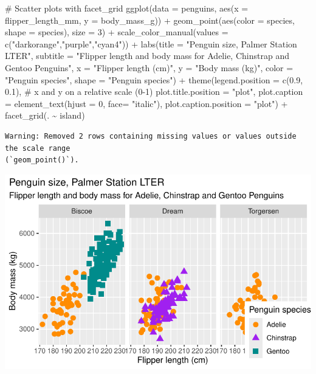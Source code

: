 \documentclass[
  letterpaper,
  DIV=11,
  numbers=noendperiod]{scrreprt}
\newenvironment{Shaded}{\begin{snugshade}}{\end{snugshade}}
\newcommand{\AttributeTok}[1]{\textcolor[rgb]{0.40,0.45,0.13}{#1}}
\newcommand{\CommentTok}[1]{\textcolor[rgb]{0.37,0.37,0.37}{#1}}
\newcommand{\DecValTok}[1]{\textcolor[rgb]{0.68,0.00,0.00}{#1}}
\newcommand{\FloatTok}[1]{\textcolor[rgb]{0.68,0.00,0.00}{#1}}
\newcommand{\FunctionTok}[1]{\textcolor[rgb]{0.28,0.35,0.67}{#1}}
\newcommand{\NormalTok}[1]{\textcolor[rgb]{0.00,0.23,0.31}{#1}}
\newcommand{\SpecialCharTok}[1]{\textcolor[rgb]{0.37,0.37,0.37}{#1}}
\newcommand{\StringTok}[1]{\textcolor[rgb]{0.13,0.47,0.30}{#1}}
\begin{document}
\begin{Shaded}
\begin{Highlighting}[]
\CommentTok{\# Scatter plots with facet\_grid}
\FunctionTok{ggplot}\NormalTok{(}\AttributeTok{data =}\NormalTok{ penguins, }\FunctionTok{aes}\NormalTok{(}\AttributeTok{x =}\NormalTok{ flipper\_length\_mm, }\AttributeTok{y =}\NormalTok{ body\_mass\_g)) }\SpecialCharTok{+}
  \FunctionTok{geom\_point}\NormalTok{(}\FunctionTok{aes}\NormalTok{(}\AttributeTok{color =}\NormalTok{ species, }\AttributeTok{shape =}\NormalTok{ species), }\AttributeTok{size =} \DecValTok{3}\NormalTok{) }\SpecialCharTok{+}
  \FunctionTok{scale\_color\_manual}\NormalTok{(}\AttributeTok{values =} \FunctionTok{c}\NormalTok{(}\StringTok{"darkorange"}\NormalTok{,}\StringTok{"purple"}\NormalTok{,}\StringTok{"cyan4"}\NormalTok{)) }\SpecialCharTok{+}
  \FunctionTok{labs}\NormalTok{(}\AttributeTok{title =} \StringTok{"Penguin size, Palmer Station LTER"}\NormalTok{,}
       \AttributeTok{subtitle =} \StringTok{"Flipper length and body mass for Adelie, Chinstrap and Gentoo Penguins"}\NormalTok{,}
       \AttributeTok{x =} \StringTok{"Flipper length (cm)"}\NormalTok{,}
       \AttributeTok{y =} \StringTok{"Body mass (kg)"}\NormalTok{,}
       \AttributeTok{color =} \StringTok{"Penguin species"}\NormalTok{,}
       \AttributeTok{shape =} \StringTok{"Penguin species"}\NormalTok{) }\SpecialCharTok{+}
  \FunctionTok{theme}\NormalTok{(}\AttributeTok{legend.position =} \FunctionTok{c}\NormalTok{(}\FloatTok{0.9}\NormalTok{, }\FloatTok{0.1}\NormalTok{), }\CommentTok{\# x and y on a relative scale (0{-}1)}
        \AttributeTok{plot.title.position =} \StringTok{"plot"}\NormalTok{,}
        \AttributeTok{plot.caption =} \FunctionTok{element\_text}\NormalTok{(}\AttributeTok{hjust =} \DecValTok{0}\NormalTok{, }\AttributeTok{face=} \StringTok{"italic"}\NormalTok{),}
        \AttributeTok{plot.caption.position =} \StringTok{"plot"}\NormalTok{) }\SpecialCharTok{+}
  \FunctionTok{facet\_grid}\NormalTok{(. }\SpecialCharTok{\textasciitilde{}}\NormalTok{ island) }
\end{Highlighting}
\end{Shaded}

\begin{verbatim}
Warning: Removed 2 rows containing missing values or values outside the scale range
(`geom_point()`).
\end{verbatim}

\includegraphics{scripts/02_dataViz/class4_files/figure-pdf/facet_grid-1.pdf}
\end{document}
